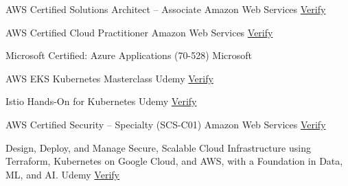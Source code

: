 
\begin{cvhonors}

  \cvhonor
    {AWS Certified Solutions Architect – Associate} %
    {Amazon Web Services} %
    {\href{https://www.credly.com/badges/0194fde7-f511-4761-8795-7150e783d14c?source=linked_in_profile}{\faCertificate\space Verify}} %
    {} %

  \cvhonor
    {AWS Certified Cloud Practitioner} %
    {Amazon Web Services} %
    {\href{https://www.credly.com/badges/8528ef32-7f12-4b28-9f4f-d22e4bbabdb6/linked_in_profile}{\faCertificate\space Verify}} %
    {} %

  \cvhonor
    {Microsoft Certified: Azure Applications (70-528)} %
    {Microsoft} %
    {} %
    {} %

  \cvhonor
    {AWS EKS Kubernetes Masterclass} %
    {Udemy} %
    {\href{https://www.udemy.com/certificate/UC-21b76729-85e4-44e4-9d4e-8fab25604d7e/}{\faCertificate\space Verify}} %
    {} %

  \cvhonor
    {Istio Hands-On for Kubernetes} %
    {Udemy} %
    {\href{https://www.udemy.com/certificate/UC-31b9d7ab-89d8-41d6-95b9-b045544cff46/}{\faCertificate\space Verify}} %
    {} %

  \cvhonor
    {AWS Certified Security – Specialty (SCS-C01)} %
    {Amazon Web Services} %
    {\href{https://www.udemy.com/certificate/UC-21b76729-85e4-44e4-9d4e-8fab25604d7e/}{\faCertificate\space Verify}} %
    {} %

  \cvhonor
    {Design, Deploy, and Manage Secure, Scalable Cloud Infrastructure using Terraform, Kubernetes on Google Cloud, and AWS, with a Foundation in Data, ML, and AI.} %
    {Udemy} %
    {\href{https://www.cloudskillsboost.google/public_profiles/6da45ab0-077b-43ed-adca-b7727f022c4b}{\faCertificate\space Verify}} %
    {} %

\end{cvhonors}

